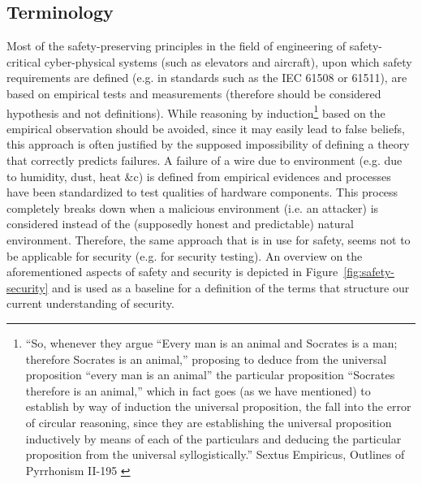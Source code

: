 \documentclass[conference]{IEEEtran}
\begin{document}
\subsection{Terminology}
Most of the safety-preserving principles in the field of engineering of
safety-critical cyber-physical systems (such as elevators and aircraft), upon
which safety requirements are defined (e.g. in standards such as the IEC 61508
or 61511\autocite{IEC201761511}), are based on empirical tests and measurements
(therefore should be considered hypothesis and not definitions). While
reasoning by induction\footnote{``So, whenever they argue ``Every man is an
animal and Socrates is a man; therefore Socrates is an animal,'' proposing to
deduce from the universal proposition ``every man is an animal'' the particular
proposition ``Socrates therefore is an animal,'' which in fact goes (as we have
mentioned) to establish by way of induction the universal proposition, the
fall into the error of circular reasoning, since they are establishing the
universal proposition inductively by means of each of the particulars and
deducing the particular proposition from the universal syllogistically.''
Sextus Empiricus, Outlines of Pyrrhonism II-195 \autocite{Empiricus1990Pyrrhonism}}
based on the empirical observation should be avoided, since it may easily lead
to false beliefs, this approach is often justified by the supposed
impossibility of defining a theory that correctly predicts failures.  A failure
of a wire due to environment (e.g. due to humidity, dust, heat \&c) is defined
from empirical evidences and processes have been standardized to test qualities
of hardware components.  This process completely breaks down when a malicious
environment (i.e. an attacker) is considered instead of the (supposedly honest
and predictable) natural environment. Therefore, the same approach that is in
use for safety, seems not to be applicable for security (e.g. for security
testing).
An overview on the aforementioned aspects of safety and security is depicted in
Figure~\ref{fig:safety-security} and is used as a baseline for a definition of
the terms that structure our current understanding of security. 
\end{document}

